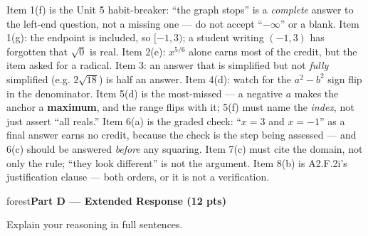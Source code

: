 \documentclass[10pt]{article}
\newcommand{\parthead}[1]{%
  \vspace{6pt}\noindent
  \begin{headlinebox}{forest}\color{white}\bfseries #1\end{headlinebox}%
  \vspace{4pt}}
\begin{document}
\begin{teachernote}
Item 1(f) is the Unit 5 habit-breaker: ``the graph stops'' is a \emph{complete} answer to the
left-end question, not a missing one --- do not accept ``$-\infty$'' or a blank. Item 1(g): the
endpoint is included, so $[-1,3)$; a student writing $(-1,3)$ has forgotten that $\sqrt0$ is real.
Item 2(e): $x^{5/6}$ alone earns most of the credit, but the item asked for a radical. Item 3: an
answer that is simplified but not \emph{fully} simplified (e.g. $2\sqrt{18}$) is half an answer.
Item 4(d): watch for the $a^2-b^2$ sign flip in the denominator. Item 5(d) is the most-missed --- a
negative $a$ makes the anchor a \textbf{maximum}, and the range flips with it; 5(f) must name the
\emph{index}, not just assert ``all reals.'' Item 6(a) is the graded check: ``$x=3$ and $x=-1$'' as a
final answer earns no credit, because the check is the step being assessed --- and 6(c) should be
answered \emph{before} any squaring. Item 7(c) must cite the domain, not only the rule; ``they look
different'' is not the argument. Item 8(b) is A2.F.2i's justification clause --- both orders, or it
is not a verification.
\end{teachernote}

\boxguard[36]%
\parthead{Part D --- Extended Response (12 pts)}
Explain your reasoning in full sentences.
\end{document}
